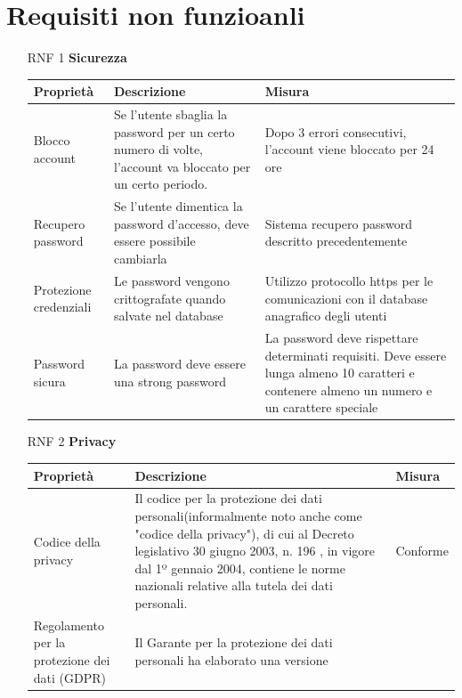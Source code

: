 \documentclass{article}
\begin{document}
\section{Requisiti non funzioanli}
\begin{itemize}
    \item [RNF 1] \textbf{Sicurezza}\\
                 \begin{tabular}{|p{5cm}|p{8cm}|p{5cm}|}
                     \hline
                     Proprietà & Descrizione & Misura\\
                     \hline
                     Blocco account & Se l’utente sbaglia la password per un certo numero di volte, l’account va bloccato per un certo periodo.&
                     Dopo 3 errori consecutivi, l’account viene bloccato per 24 ore\\
                     \hline
                     Recupero password & Se l’utente dimentica la password d’accesso, deve essere possibile cambiarla & Sistema recupero password descritto precedentemente\\
                     \hline
                     Protezione credenziali & Le password vengono crittografate quando salvate nel database & Utilizzo protocollo https per le comunicazioni con il database anagrafico degli utenti\\
                     \hline
                     Password sicura&La password deve essere una strong password&La password deve rispettare determinati requisiti. Deve essere lunga almeno 10 caratteri e contenere almeno un numero e un carattere speciale\\
                     \hline
                 \end{tabular}
   \item [RNF 2] \textbf{Privacy}\\
                 \begin{tabular}{|p{5cm}|p{11cm}|p{2cm}|}
                     \hline
                     Proprietà & Descrizione & Misura\\
                     \hline
                     Codice della privacy & Il codice per la protezione dei dati personali(informalmente noto anche come "codice della privacy"), 
                     di cui al Decreto legislativo 30 giugno 2003, n. 196 , in vigore dal 1º gennaio 2004, contiene le norme nazionali relative alla
                     tutela dei dati personali. & Conforme\\
                     \hline
                     Regolamento per la protezione dei dati (GDPR) & Il Garante per la protezione dei dati personali ha elaborato una versione

\end{tabular}
\end{itemize}
\end{document}

